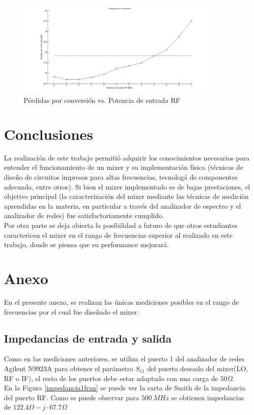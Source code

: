 \documentclass[a4paper,10pt]{article}
\begin{document}
	\begin{figure}[!htb]
		\centering
		\includegraphics[width=10cm]{Images/compresion.png}
		\caption{P\'erdidas por conversi\'on vs. Potencia de entrada RF}
		\label{compresion}
	\end{figure}	
	
	\newpage
	\section{Conclusiones}
	\indent La realizaci\'on de este trabajo permiti\'o adquirir los 
	conocimientos necesarios para entender el funcionamiento de un mixer y su 
	implementaci\'on f\'isica (t\'ecnicas de dise\~no de circuitos impresos para
	altas frecuencias, tecnolog\'a de componentes adecuada, entre otros). Si 
	bien el mixer implementado es de bajas prestaciones, el objetivo principal 
	(la caracterizaci\'on del mixer mediante las t\'ecnicas de medici\'on 
	aprendidas en la materia, en particular a trav\'es del analizador de 
	espectro y el analizador de redes) fue satisfactoriamente cumplido. \\
	\indent Por otra parte se deja abierta la posibilidad a futuro de que otros 
	estudiantes caractericen el mixer en el rango de frecuencias superior al 
	realizado en este trabajo, donde se piensa que su performance mejorar\'a. 

	\newpage
	\section{Anexo}
	\indent En el presente anexo, se realizan las únicas mediciones posibles en 
	el rango de frecuencias por el cual fue diseñado el mixer. 
	
	\subsection{Impedancias de entrada y salida}
	\indent Como en las mediciones anteriores, se utiliza el puerto 1 del 
	analizador de redes Agilent N9923A para obtener el par\'ametro $S_{11}$ del 
	puerto deseado del mixer(LO, RF o IF), el resto de los puertos debe estar 
	adaptado con una carga de $50\Omega$. \\
	\indent En la Figura \ref{impedancia1fran} se puede ver la carta de Smith 
	de la impedancia del puerto RF. Como se puede observar para $500~MHz$ se 
	obtienen impedancias de $122.4\Omega-j\cdot67.7\Omega$
	
\end{document}
